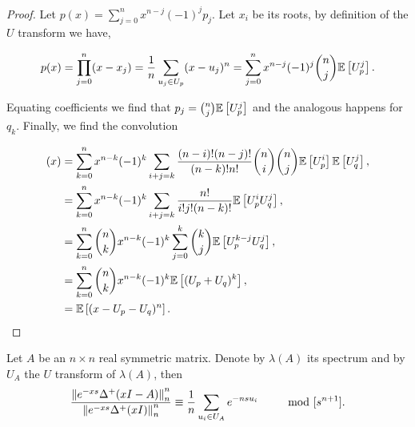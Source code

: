 \begin{proof}
    Let $p(x) = \sum_{j=0}^n x^{n-j}(-1)^j p_j$. Let $x_i$ be its roots, by definition of the $U$ transform we have,

    \begin{equation*}
        p(x) = \prod_{j=0}^n (x - x_j) = \frac1n \sum_{u_j \in U_p} (x-u_j)^n = \sum_{j=0}^n x^{n-j} (-1)^j \binom n j \mathbb E \left[ U_p^j \right].
    \end{equation*}

    Equating coefficients we find that $p_j = \binom nj\mathbb E \left[ U_p^j \right]$ and the analogous happens for $q_k$. Finally, we find the convolution

    \begin{align*}
        [p\boxplus_n q](x) &= \sum_{k=0}^n x^{n-k}(-1)^k \sum_{i+j=k} \frac{(n-i)!(n-j)!}{(n-k)!n!} \binom{n}{i}\binom{n}{j} \E{U_p^i} \E{U_q^j},\\
        &= \sum_{k=0}^n x^{n-k}(-1)^k \sum_{i+j=k} \frac{n!}{i!j!(n-k)!} \E{U_p^i U_q^j}, \\
        &= \sum_{k=0}^n \binom nk x^{n-k}(-1)^k \sum_{j=0}^k \binom{k}{j}\E{U_p^{k-j} U_q^j}, \\
        &= \sum_{k=0}^n \binom nk x^{n-k}(-1)^k \E{(U_p + U_q)^k},\\
        &= \E{ (x - U_p - U_q)^n }. 
    \end{align*}
\end{proof}

\begin{lemma}  \label{lemma:quotient_norms}
    Let $A$ be an $n\times n$ real symmetric matrix. Denote by $\lambda(A)$ its spectrum and by $U_A$ the $U$ transform of $\lambda(A)$, then 
    \begin{equation*}
        \frac{\left\lVert e^{-xs}\Delta^+(xI - A)\right\rVert_n^n}{\left\lVert e^{-xs}\Delta^+(xI)\right\rVert_n^n} \equiv \frac1n\sum_{u_i \in U_A} e^{-ns u_i} \qquad \mod [s^{n+1}]. 
    \end{equation*} 
\end{lemma}

